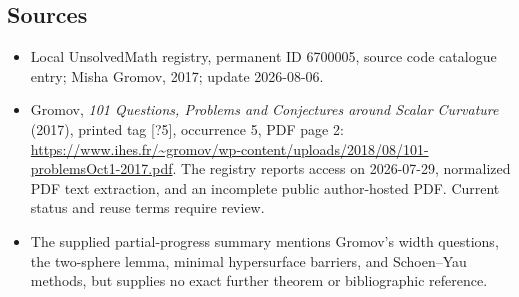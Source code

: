 \documentclass[11pt]{article}
\begin{document}
\subsection{Sources}
\begin{itemize}
\item Local UnsolvedMath registry, permanent ID 6700005, source code catalogue entry; Misha Gromov, 2017; update 2026-08-06.
\item Gromov, \emph{101 Questions, Problems and Conjectures around Scalar Curvature} (2017), printed tag [?5], occurrence 5, PDF page 2: \url{https://www.ihes.fr/~gromov/wp-content/uploads/2018/08/101-problemsOct1-2017.pdf}. The registry reports access on 2026-07-29, normalized PDF text extraction, and an incomplete public author-hosted PDF. Current status and reuse terms require review.
\item The supplied partial-progress summary mentions Gromov's width questions, the two-sphere lemma, minimal hypersurface barriers, and Schoen--Yau methods, but supplies no exact further theorem or bibliographic reference.
\end{itemize}
\end{document}
